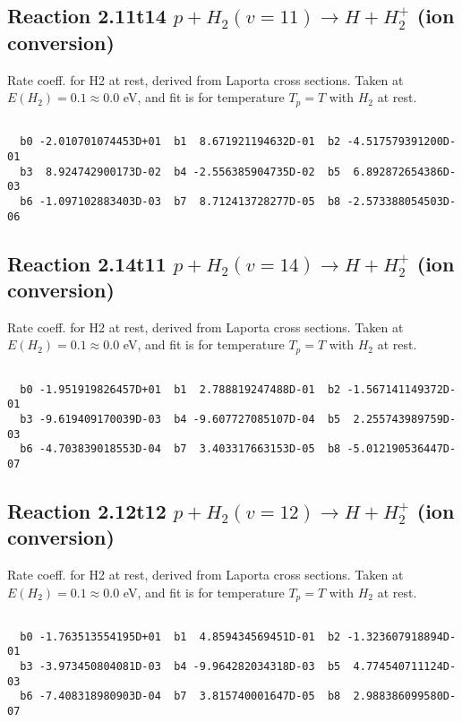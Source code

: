 \newpage
\subsection{
Reaction 2.11t14
$ p + H_2(v=11) \rightarrow H + H_2^+$ (ion conversion)
}
Rate coeff. for H2 at rest, derived from Laporta cross sections.
Taken at $E(H_2) = 0.1 \approx 0.0$ eV,  and fit is for temperature $T_p=T$ with $H_2$ at rest.

\begin{small}\begin{verbatim}

  b0 -2.010701074453D+01  b1  8.671921194632D-01  b2 -4.517579391200D-01
  b3  8.924742900173D-02  b4 -2.556385904735D-02  b5  6.892872654386D-03
  b6 -1.097102883403D-03  b7  8.712413728277D-05  b8 -2.573388054503D-06

\end{verbatim}\end{small}

\newpage
\subsection{
Reaction 2.14t11
$ p + H_2(v=14) \rightarrow H + H_2^+$ (ion conversion)
}
Rate coeff. for H2 at rest, derived from Laporta cross sections.
Taken at $E(H_2) = 0.1 \approx 0.0$ eV,  and fit is for temperature $T_p=T$ with $H_2$ at rest.

\begin{small}\begin{verbatim}

  b0 -1.951919826457D+01  b1  2.788819247488D-01  b2 -1.567141149372D-01
  b3 -9.619409170039D-03  b4 -9.607727085107D-04  b5  2.255743989759D-03
  b6 -4.703839018553D-04  b7  3.403317663153D-05  b8 -5.012190536447D-07

\end{verbatim}\end{small}

\newpage
\subsection{
Reaction 2.12t12
$ p + H_2(v=12) \rightarrow H + H_2^+$ (ion conversion)
}
Rate coeff. for H2 at rest, derived from Laporta cross sections.
Taken at $E(H_2) = 0.1 \approx 0.0$ eV,  and fit is for temperature $T_p=T$ with $H_2$ at rest.

\begin{small}\begin{verbatim}

  b0 -1.763513554195D+01  b1  4.859434569451D-01  b2 -1.323607918894D-01
  b3 -3.973450804081D-03  b4 -9.964282034318D-03  b5  4.774540711124D-03
  b6 -7.408318980903D-04  b7  3.815740001647D-05  b8  2.988386099580D-07

\end{verbatim}\end{small}

